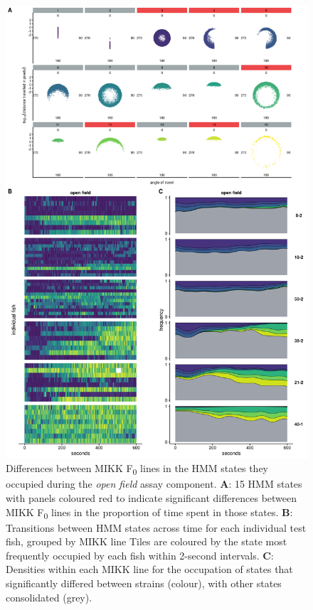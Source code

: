 \documentclass[
]{book}
\begin{document}
\begin{figure}
\includegraphics[width=1\linewidth]{figs/mikk_behaviour/select_0.08_15_dge_of} \caption{Differences between MIKK F\textsubscript{0} lines in the HMM states they occupied during the \emph{open field} assay component. \textbf{A}: 15 HMM states with panels coloured red to indicate significant differences between MIKK F\textsubscript{0} lines in the proportion of time spent in those states. \textbf{B}: Transitions between HMM states across time for each individual test fish, grouped by MIKK line Tiles are coloured by the state most frequently occupied by each fish within 2-second intervals. \textbf{C}: Densities within each MIKK line for the occupation of states that significantly differed between strains (colour), with other states consolidated (grey).}\label{fig:F2-time-dge-of}
\end{figure}
\end{document}
